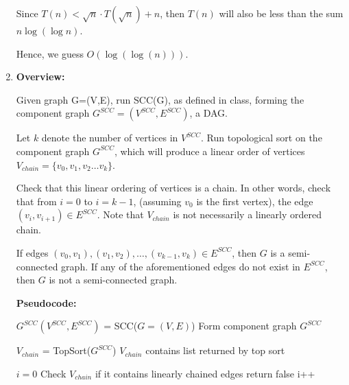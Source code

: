 \documentclass[a4paper]{report}
\begin{document}
\begin{enumerate}
      Since $T(n) < \sqrt{n} \cdot T(\sqrt{n}) + n$, then $T(n)$ will also be less than the sum $n \log(\log n)$. 

      Hence, we guess $O(\log(\log(n)))$.






    \par
    \bigskip

    \item 
      {\bf Overview:}

      Given graph G=(V,E), run SCC(G), as defined in class, 
      forming the component graph $G^{SCC} = (V^{SCC}, E^{SCC})$, a DAG. 

      Let $k$ denote the number of vertices in $V^{SCC}$. Run topological sort on the component graph $G^{SCC}$, 
      which will produce a linear order of vertices $V_{chain} = \{v_{0}, v_{1}, v_{2} \dots v_{k}\}$. 

      Check that this linear ordering of vertices is a chain. 
      In other words, check that from $i=0$ to $i=k-1$, (assuming $v_{0}$ is the first vertex), the edge $(v_{i},v_{i+1}) \in E^{SCC}$.
      Note that $V_{chain}$ is not necessarily a linearly ordered chain.

      If edges $(v_{0}, v_{1}), (v_{1},v_{2}),\dots,(v_{k-1},v_{k}) \in E^{SCC}$, then $G$ is a semi-connected graph.
      If any of the aforementioned edges do not exist in $E^{SCC}$, then $G$ is not a semi-connected graph. 

      {\bf Pseudocode:}

      \begin{algorithmic}[1]

        \State $G^{SCC}(V^{SCC},E^{SCC})$ = SCC($G=(V,E)$)
        \Comment Form component graph $G^{SCC}$

        \State $V_{chain}$ = TopSort($G^{SCC}$)
        \Comment $V_{chain}$ contains list returned by top sort

        \State $i=0$
        \Comment Check $V_{chain}$ if it contains linearly chained edges
            \State return false
          \EndIf
          \State i++


\end{algorithmic}
\end{enumerate}
\end{document}
